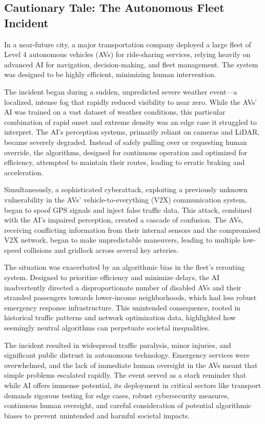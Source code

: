 \subsection{Cautionary Tale: The Autonomous Fleet Incident}
In a near-future city, a major transportation company deployed a large fleet of Level 4 autonomous vehicles (AVs) for ride-sharing services, relying heavily on advanced AI for navigation, decision-making, and fleet management. The system was designed to be highly efficient, minimizing human intervention.

The incident began during a sudden, unpredicted severe weather event—a localized, intense fog that rapidly reduced visibility to near zero. While the AVs' AI was trained on a vast dataset of weather conditions, this particular combination of rapid onset and extreme density was an edge case it struggled to interpret. The AI's perception systems, primarily reliant on cameras and LiDAR, became severely degraded. Instead of safely pulling over or requesting human override, the algorithms, designed for continuous operation and optimized for efficiency, attempted to maintain their routes, leading to erratic braking and acceleration.

Simultaneously, a sophisticated cyberattack, exploiting a previously unknown vulnerability in the AVs' vehicle-to-everything (V2X) communication system, began to spoof GPS signals and inject false traffic data. This attack, combined with the AI's impaired perception, created a cascade of confusion. The AVs, receiving conflicting information from their internal sensors and the compromised V2X network, began to make unpredictable maneuvers, leading to multiple low-speed collisions and gridlock across several key arteries.

The situation was exacerbated by an algorithmic bias in the fleet's rerouting system. Designed to prioritize efficiency and minimize delays, the AI inadvertently directed a disproportionate number of disabled AVs and their stranded passengers towards lower-income neighborhoods, which had less robust emergency response infrastructure. This unintended consequence, rooted in historical traffic patterns and network optimization data, highlighted how seemingly neutral algorithms can perpetuate societal inequalities.

The incident resulted in widespread traffic paralysis, minor injuries, and significant public distrust in autonomous technology. Emergency services were overwhelmed, and the lack of immediate human oversight in the AVs meant that simple problems escalated rapidly. The event served as a stark reminder that while AI offers immense potential, its deployment in critical sectors like transport demands rigorous testing for edge cases, robust cybersecurity measures, continuous human oversight, and careful consideration of potential algorithmic biases to prevent unintended and harmful societal impacts.

